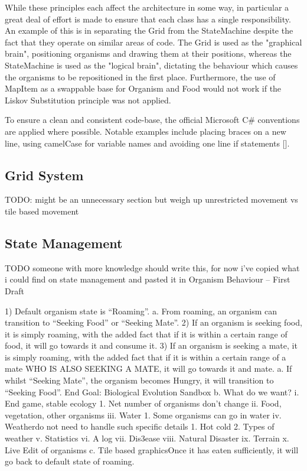 \documentclass{ueacmpstyle}
\begin{document}
While these principles each affect the architecture in some way, in particular a great deal of effort is made to ensure that each class has a single responsibility. An example of this is in separating the Grid from the StateMachine despite the fact that they operate on similar areas of code. The Grid is used as the "graphical brain", positioning organisms and drawing them at their positions, whereas the StateMachine is used as the "logical brain", dictating the behaviour which causes the organisms to be repositioned in the first place. Furthermore, the use of MapItem as a swappable base for Organism and Food would not work if the Liskov Substitution principle was not applied.

To ensure a clean and consistent code-base, the official Microsoft C\# conventions are applied where possible. Notable examples include placing braces on a new line, using camelCase for variable names and avoiding one line if statements [\cite{microsoft}].

\subsection{Grid System}
TODO: might be an unnecessary section but weigh up unrestricted movement vs tile based movement

\subsection{State Management}
TODO someone with more knowledge should write this, for now i've copied what i could find on state management and pasted it in
Organism Behaviour – First Draft

1) Default organism state is “Roaming”.
a. From roaming, an organism can transition to “Seeking Food” or “Seeking Mate”.
2) If an organism is seeking food, it is simply roaming, with the added fact that if it is within a certain range of food, it will go towards it and consume it.
3) If an organism is seeking a mate, it is simply roaming, with the added fact that if it is within a certain range of a mate WHO IS ALSO SEEKING A MATE, it will go towards it and mate.
a. If whilst “Seeking Mate”, the organism becomes Hungry, it will transition to “Seeking Food”. End Goal: Biological Evolution Sandbox
b. What do we want?
i. End game, stable ecology
1. Net number of organisms don’t change
ii. Food, vegetation, other organisms
iii. Water
1. Some organisms can go in water
iv. Weatherdo not need to handle such specific details
1. Hot cold
2. Types of weather
v. Statistics
vi. A log
vii. Dis3ease
viii. Natural Disaster
ix. Terrain
x. Live Edit of organisms
c. Tile based graphicsOnce it has eaten sufficiently, it will go back to default state of roaming.
\end{document}
